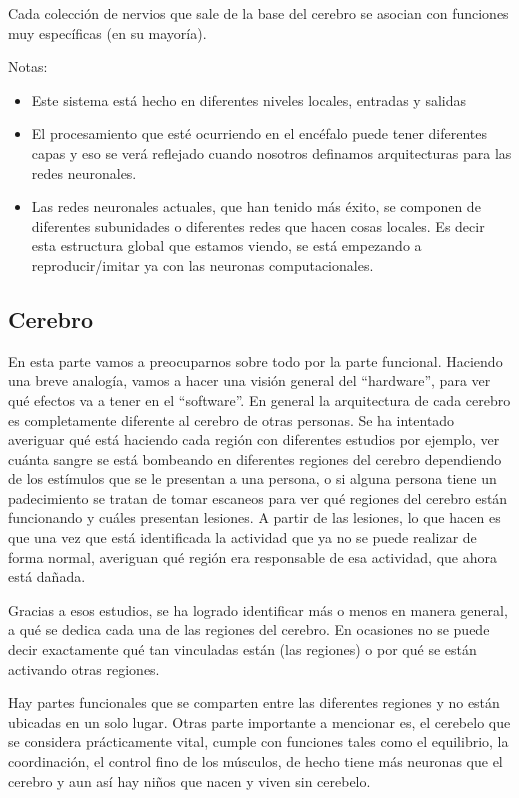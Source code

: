 Cada colección de nervios que sale de la base del cerebro se asocian con funciones muy específicas (en su mayoría). 
 
 Notas:
 
 \begin{itemize}
  \item Este sistema está hecho en diferentes niveles locales, entradas y salidas  
  \item El procesamiento que esté ocurriendo en el encéfalo puede tener diferentes capas y eso se verá reflejado cuando nosotros definamos arquitecturas para las redes neuronales. 
  \item Las redes neuronales actuales, que han tenido más éxito, se componen de diferentes subunidades o diferentes redes que hacen cosas locales. Es decir esta estructura global que estamos viendo,  se está empezando a reproducir/imitar ya con las neuronas computacionales.


 \end{itemize}




\subsection{Cerebro}


En esta parte vamos a preocuparnos sobre todo por la parte funcional. Haciendo una breve analogía, vamos a hacer una visión general del “hardware”, para ver qué efectos va a tener en el “software”. 
En general la arquitectura de cada cerebro es completamente diferente al cerebro de otras personas. Se ha intentado averiguar qué está haciendo cada región con diferentes estudios por ejemplo,  ver cuánta sangre se está bombeando en diferentes regiones del cerebro dependiendo de los estímulos que se le presentan a una persona, o si alguna persona tiene un padecimiento se tratan de tomar escaneos para ver qué regiones del cerebro están funcionando y cuáles presentan lesiones. A partir de las lesiones, lo que hacen es que una vez que está identificada la actividad que ya no se puede realizar de forma normal, averiguan qué región era responsable de esa actividad, que ahora está dañada.


Gracias a esos estudios, se ha logrado identificar más o menos en manera general, a qué se dedica cada una de las regiones del cerebro. En ocasiones no se puede decir exactamente qué tan vinculadas están (las regiones) o por qué se están activando otras regiones.


Hay partes funcionales que se comparten entre las diferentes regiones y no están ubicadas en un solo lugar. Otras parte importante a mencionar es, el cerebelo que se considera prácticamente vital, cumple con funciones tales como el equilibrio, la coordinación, el control fino de los músculos, de hecho tiene más neuronas que el cerebro y aun así hay niños que nacen y viven sin cerebelo. 




